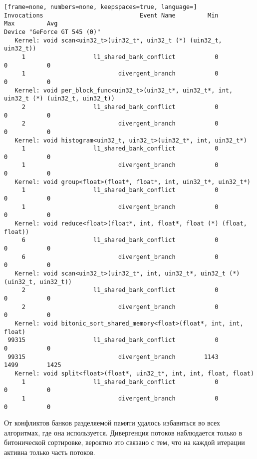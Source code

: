 \begin{lstlisting}[frame=none, numbers=none, keepspaces=true, language=]
Invocations                           Event Name         Min         Max         Avg
Device "GeForce GT 545 (0)"
   Kernel: void scan<uin32_t>(uin32_t*, uin32_t (*) (uin32_t, uin32_t))
     1                   l1_shared_bank_conflict           0           0           0
     1                          divergent_branch           0           0           0
   Kernel: void per_block_func<uin32_t>(uin32_t*, uin32_t*, int, uin32_t (*) (uin32_t, uin32_t))
     2                   l1_shared_bank_conflict           0           0           0
     2                          divergent_branch           0           0           0
   Kernel: void histogram<uin32_t, uin32_t>(uin32_t*, int, uin32_t*)
     1                   l1_shared_bank_conflict           0           0           0
     1                          divergent_branch           0           0           0
   Kernel: void group<float>(float*, float*, int, uin32_t*, uin32_t*)
     1                   l1_shared_bank_conflict           0           0           0
     1                          divergent_branch           0           0           0
   Kernel: void reduce<float>(float*, int, float*, float (*) (float, float))
     6                   l1_shared_bank_conflict           0           0           0
     6                          divergent_branch           0           0           0
   Kernel: void scan<uin32_t>(uin32_t*, int, uin32_t*, uin32_t (*) (uin32_t, uin32_t))
     2                   l1_shared_bank_conflict           0           0           0
     2                          divergent_branch           0           0           0
   Kernel: void bitonic_sort_shared_memory<float>(float*, int, int, float)
 99315                   l1_shared_bank_conflict           0           0           0
 99315                          divergent_branch        1143        1499        1425
   Kernel: void split<float>(float*, uin32_t*, int, int, float, float)
     1                   l1_shared_bank_conflict           0           0           0
     1                          divergent_branch           0           0           0
\end{lstlisting}

От конфликтов банков разделяемой памяти удалось избавиться во всех алгоритмах, где она используется. Дивергенция потоков наблюдается только в битонической сортировке, вероятно это связано с тем, что на каждой итерации активна только часть потоков.
\pagebreak

